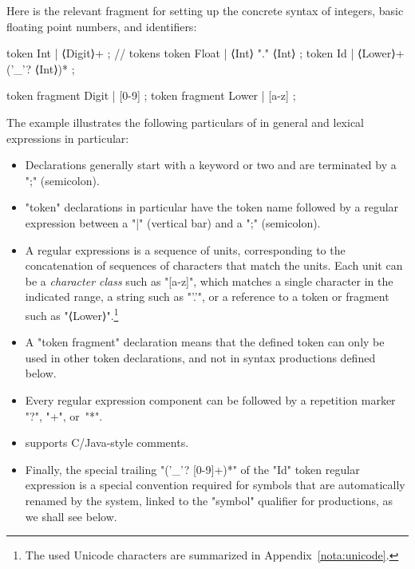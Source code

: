 \documentclass[11pt]{article} %
\begin{document}
\begin{example}[tokens]\label{ex:tokens}
  Here is the relevant fragment for setting up the concrete syntax of integers, basic floating point
  numbers, and identifiers:
\begin{code}
token Int    | ⟨Digit⟩+ ;                       // tokens
token Float  | ⟨Int⟩ "." ⟨Int⟩ ;
token Id     | ⟨Lower⟩+ ('_'? ⟨Int⟩)* ;

token fragment Digit  | [0-9] ;
token fragment Lower  | [a-z] ;
\end{code}
  The example illustrates the following particulars of \HAX in general and lexical expressions in
  particular:
  \begin{itemize}

  \item Declarations generally start with a keyword or two and are terminated by a ";" (semicolon).

  \item "token" declarations in particular have the token name followed by a regular expression
    between a "|" (vertical bar) and a ";" (semicolon).

  \item A regular expressions is a sequence of units, corresponding to the concatenation of
    sequences of characters that match the units.  Each unit can be a \emph{character class} such as
    "[a-z]", which matches a single character in the indicated range, a string such as "'.'", or a
    reference to a token or fragment such as "⟨Lower⟩".\footnote{The used Unicode characters are
      summarized in Appendix~\ref{nota:unicode}.}

  \item A "token fragment" declaration means that the defined token can only be used in other token
    declarations, and not in syntax productions defined below.

  \item Every regular expression component can be followed by a repetition marker "?", "+", or~"*".

  \item \HAX supports C/Java-style comments.

  \item Finally, the special trailing "('_'? [0-9]+)*" of the "Id" token regular expression is a
    special convention required for symbols that are automatically renamed by the system, linked to
    the "symbol" qualifier for productions, as we shall see below.

  \end{itemize}
\end{example}
\end{document}

